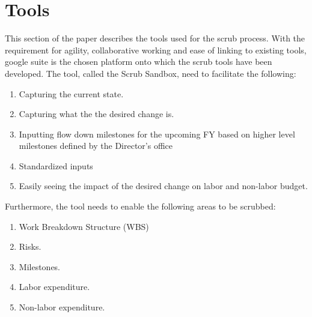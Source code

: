 \section{Tools} \label{sec:tools}

This section of the paper describes the tools used for the scrub process. With the requirement for agility, collaborative working and ease of linking to existing tools, google suite is the chosen platform onto which the scrub tools have been developed. The tool, called the Scrub Sandbox,  need to facilitate the following:

\begin{enumerate}
\item Capturing the current state.
\item Capturing what the the desired change is.
\item Inputting flow down milestones for the upcoming FY based on higher level milestones defined by the Director’s office
\item Standardized inputs
\item Easily seeing the impact of the desired change on labor and non-labor budget.
\end{enumerate}

\begin{figure}
\end{figure}


Furthermore, the tool needs to enable the following areas to be scrubbed:
\begin{enumerate}
\item Work Breakdown Structure (WBS)
\item Risks.
\item Milestones.
\item Labor expenditure.
\item Non-labor expenditure.
\end{enumerate}

